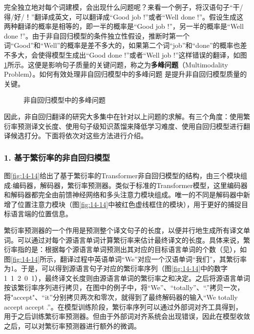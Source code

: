 \parinterval 完全独立地对每个词建模，会出现什么问题呢？来看一个例子，将汉语句子“干/得/好/！”翻译成英文，可以翻译成“Good job !”或者“Well done !”。假设生成这两种翻译的概率是相等的，即一半的概率是“Good job !”，另一半的概率是“Well done !”。由于非自回归模型的条件独立性假设，推断时第一个词“Good”和“Well”的概率是差不多大的，如果第二个词“job”和“done”的概率也差不多大，会使得模型生成出“Good done !”或者“Well job !”这样错误的翻译，如图\ref{fig:14-13}所示。这便是影响句子质量的关键问题，称之为{\small\sffamily\bfseries{多峰问题}}（Multimodality Problem）。如何有效处理非自回归模型中的多峰问题  是提升非自回归模型质量的关键。

\begin{figure}[htp]
\centering
 
\caption{非自回归模型中的多峰问题}
\label{fig:14-13}
\end{figure}

\parinterval 因此，非自回归翻译的研究大多集中在针对以上问题的求解。有三个角度：使用繁衍率预测译文长度、使用句子级知识蒸馏来降低学习难度、使用自回归模型进行翻译候选打分。下面将依次对这些方法进行介绍。


\subsubsection{1. 基于繁衍率的非自回归模型}

\parinterval 图\ref{fig:14-14}给出了基于繁衍率的Transformer非自回归模型的结构，由三个模块组成:编码器，解码器，繁衍率预测器。类似于标准的Transformer模型，这里编码器和解码器都完全由前馈神经网络和多头注意力模块组成。唯一的不同是解码器中新增了位置注意力模块（图\ref{fig:14-14}中被红色虚线框住的模块），用于更好的捕捉目标语言端的位置信息。

\parinterval 繁衍率预测器的一个作用是预测整个译文句子的长度，以便并行地生成所有译文单词。可以通过对每个源语言单词计算繁衍率来估计最终译文的长度。具体来说，繁衍率指的是：根据每个源语言单词预测出其对应的目标语言单词的个数（见\chaptersix），如图\ref{fig:14-14}所示，翻译过程中英语单词“We”对应一个汉语单词“我们”，其繁衍率为1。于是，可以得到源语言句子对应的繁衍率序列（图\ref{fig:14-14}中的数字1\ 1\ 2\ 0\ 1），最终译文长度则由源语言单词的繁衍率之和决定。之后将源语言单词按该繁衍率序列进行拷贝，在图中的例子中，将“We”、“totally”、“.”拷贝一次，将"accept"、“it”分别拷贝两次和零次，就得到了最终解码器的输入“We totally accept accept .”。在模型训练阶段，繁衍率序列可以通过外部词对齐工具得到， 用于之后训练繁衍率预测器。但由于外部词对齐系统会出现错误，因此在模型收敛之后，可以对繁衍率预测器进行额外的微调。

